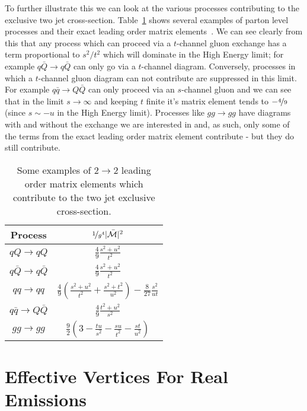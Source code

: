 	To further illustrate this we can look at the various processes contributing to the exclusive two
	jet cross-section.  Table~\ref{tab:LOatHE} shows several examples of parton level
	processes and their exact leading order matrix elements~\cite{pinkBook}.  We can see clearly
	from this that any process which can proceed via a $t$-channel gluon exchange has a term
	proportional to $s^2/t^2$ which will dominate in the High Energy limit; for
	example $q\bar{Q}\to q\bar{Q}$ can only go via a $t$-channel diagram.
	Conversely, processes in which a $t$-channel gluon diagram can not contribute are
	suppressed in this limit.  For example $q\bar{q}\to Q\bar{Q}$ can only proceed via an
	$s$-channel gluon and we can see that in the limit $s\to\infty$ and keeping $t$ finite it's matrix
	element tends to $-\nicefrac{4}{9}$ (since $s\sim-u$ in the High Energy limit).  Processes
	like $gg\to gg$ have diagrams with and without the exchange we are interested in
	and, as such, only some of the terms from the exact leading order matrix element
	contribute - but they do still contribute.

	\begin{table}[hbt!]
		\begin{center}
		\begin{tabular}{c | c }
		Process                 & $\nicefrac{1}{g^4}|\bar{\mathcal{M}}|^2$ \\ \hline
		$qQ\to qQ$              & $\frac{4}{9}\frac{s^2 + u^2}{t^2}$       \\
		$q\bar{Q}\to q\bar{Q}$  & $\frac{4}{9}\frac{s^2 + u^2}{t^2}$       \\
		$qq\to qq$              & $\frac{4}{9}\left(\frac{s^2 + u^2}{t^2} + \frac{s^2 + t^2}{u^2}\right) - \frac{8}{27}\frac{s^2}{ut}$\\
		$q\bar{q}\to Q\bar{Q}$  & $\frac{4}{9}\frac{t^2 + u^2}{s^2}$       \\
		$gg\to gg$              & $\frac{9}{2}\left(3-\frac{tu}{s^2}-\frac{su}{t^2}-\frac{st}{u^2}\right)$\\
		\end{tabular}
		\caption{Some examples of $2\to2$ leading order matrix elements which contribute to the
		two jet exclusive cross-section.}
		\label{tab:LOatHE}
		\end{center}
	\end{table}

\section{Effective Vertices For Real Emissions}
	\label{sec:effectiveVertices}

